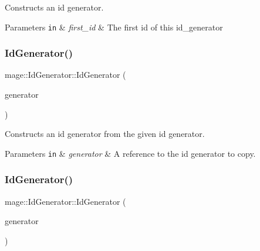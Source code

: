 Constructs an id generator.


\begin{DoxyParams}[1]{Parameters}
\mbox{\tt in}  & {\em first\+\_\+id} & The first id of this id\+\_\+generator \\
\hline
\end{DoxyParams}
\mbox{\label{classmage_1_1_id_generator_a1abb8c44b89ac1344ad8016f54e076de}} 
\subsubsection{\texorpdfstring{Id\+Generator()}{IdGenerator()}\hspace{0.1cm}{\footnotesize\ttfamily [2/3]}}
{\footnotesize\ttfamily mage\+::\+Id\+Generator\+::\+Id\+Generator (\begin{DoxyParamCaption}\item[{const \mbox{\hyperlink{classmage_1_1_id_generator}{Id\+Generator}} \&}]{generator }\end{DoxyParamCaption})\hspace{0.3cm}{\ttfamily [delete]}}

Constructs an id generator from the given id generator.


\begin{DoxyParams}[1]{Parameters}
\mbox{\tt in}  & {\em generator} & A reference to the id generator to copy. \\
\hline
\end{DoxyParams}
\mbox{\label{classmage_1_1_id_generator_a0f678af51553c455655589ecfe7f1c8f}} 
\subsubsection{\texorpdfstring{Id\+Generator()}{IdGenerator()}\hspace{0.1cm}{\footnotesize\ttfamily [3/3]}}
{\footnotesize\ttfamily mage\+::\+Id\+Generator\+::\+Id\+Generator (\begin{DoxyParamCaption}\item[{\mbox{\hyperlink{classmage_1_1_id_generator}{Id\+Generator}} \&\&}]{generator }\end{DoxyParamCaption})\hspace{0.3cm}{\ttfamily [delete]}}

